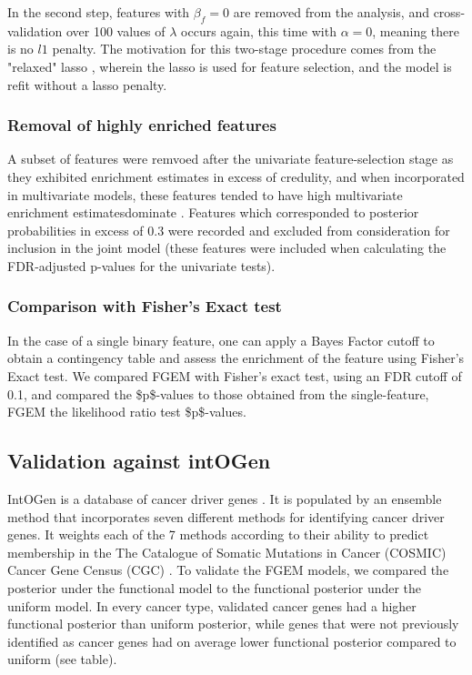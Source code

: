 In the second step, features with \(\beta_f=0\) are removed from the analysis, and cross-validation over 100 values of \(\lambda\) occurs again, this time with \(\alpha = 0\), meaning there is no \(l1\) penalty.  The motivation for this two-stage
procedure comes from the "relaxed" lasso \cite{hastie17_exten_compar_best_subset_selec}, wherein the lasso is used for feature selection, and the model is refit without a lasso penalty.  

\subsubsection{Removal of highly enriched features}\label{sec:org02cff25}

    A subset of features were remvoed after the univariate feature-selection stage as they exhibited enrichment estimates in excess of credulity, and when incorporated in multivariate models, these features tended to have high multivariate enrichment estimatesdominate . Features which corresponded to posterior probabilities in excess of 0.3 were 
recorded and excluded from consideration for inclusion in the joint model (these features were included when calculating the FDR-adjusted p-values for the univariate tests).  

\subsubsection{Comparison with Fisher's Exact test}\label{sec:orge6f1632}

In the case of a single binary feature, one can apply a Bayes Factor cutoff to obtain a contingency table and assess the enrichment of the feature using Fisher's Exact test.
We compared FGEM with Fisher's exact test, using an FDR cutoff of 0.1, and compared the \$p\$-values to those obtained from the single-feature, FGEM the likelihood ratio test \$p\$-values.

\subsection{Validation against intOGen}\label{sec:orgd8b4e10}

IntOGen is a database of cancer driver genes \cite{gonzalez-perez13_intog_mutat_ident_cancer_driver}.  It is populated by an ensemble method that incorporates seven different methods for identifying cancer driver genes.  
It weights each of the 7 methods according to their ability to predict membership in the The Catalogue of Somatic Mutations in Cancer (COSMIC) Cancer Gene Census (CGC) \cite{COSMIC}.
To validate the FGEM models, we compared the posterior under the functional model to the functional posterior under the uniform model.  In every cancer type, validated cancer genes had a higher functional posterior than 
uniform posterior, while genes that were not previously identified as cancer genes had on average lower functional posterior compared to uniform (see table). 

